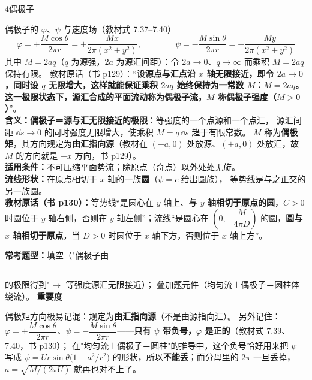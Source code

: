 \begin{kaodian}{4}{偶极子}
\begin{gongshi}{偶极子的 $\varphi$、$\psi$ 与速度场（教材式 7.37--7.40）}
\[ \varphi=+\frac{M\cos\theta}{2\pi r}=+\frac{Mx}{2\pi(x^2+y^2)},\qquad\qquad
   \psi=-\frac{M\sin\theta}{2\pi r}=-\frac{My}{2\pi(x^2+y^2)} \]
其中 $M=2aq$（$q$ 为源强，$2a$ 为源汇间距）：令 $2a\to0$、$q\to\infty$ 而乘积 $M=2aq$ 保持有限。
教材原话（书 p129）：“\textbf{设源点与汇点沿 $x$ 轴无限接近，即令 $2a\to0$，同时设 $q$ 无限增大，这样就能保证乘积 $2aq$ 始终保持为一常数 $M$：$M=2aq$。这一极限状态下，源汇合成的平面流动称为偶极子流，$M$ 称偶极子强度（$M>0$）}”。\\
\textbf{含义：}\textbf{偶极子＝源与汇无限接近的极限}：等强度的一个点源和一个点汇，
源汇间距 $\dd s\to0$ 的同时强度无限增大，使乘积 $M=q\,\dd s$ 趋于有限常数。
$M$ 称为\textbf{偶极矩}，其方向规定为\textbf{由汇指向源}（教材在 $(-a,0)$ 处放源、$(+a,0)$ 处放汇，故 $M$ 的方向就是 $-x$ 方向，书 p129）。\\
\textbf{适用条件：}不可压缩平面势流；除原点（奇点）以外处处无旋。\\
\textbf{流线形状：}在原点相切于 $x$ 轴的一族\textbf{圆}（$\psi=c$ 给出圆族），
等势线是与之正交的另一族圆。\\
\textbf{教材原话（书 p130）：}等势线“是圆心在 $y$ 轴上、\textbf{与 $y$ 轴相切于原点的圆}，$C>0$ 时圆位于 $y$ 轴右侧，否则在 $y$ 轴左侧”；流线“是圆心在 $\left(0,-\dfrac{M}{4\pi D}\right)$ 的圆，\textbf{圆与 $x$ 轴相切于原点}，当 $D>0$ 时圆位于 $x$ 轴下方，否则位于 $x$ 轴上方”。
\end{gongshi}
\textbf{常考题型：}填空（"偶极子由\rule{1.8cm}{0.4pt}的极限得到"$\to$ 等强度源汇无限接近）；
叠加题元件（均匀流＋偶极子＝圆柱体绕流）。
\textbf{重要度 }\quad{}\quad{}

\begin{yicuo}
偶极矩方向极易记混：规定为\textbf{由汇指向源}（不是由源指向汇）。
另外记住：$\varphi=+\dfrac{M\cos\theta}{2\pi r}$、$\psi=-\dfrac{M\sin\theta}{2\pi r}$——\textbf{只有 $\psi$ 带负号，$\varphi$ 是正的}（教材式 7.39、7.40，书 p130）；
在"均匀流＋偶极子＝圆柱"的推导中，这个负号恰好用来把 $\psi$ 写成
$\psi=Ur\sin\theta\bigl(1-a^2/r^2\bigr)$ 的形状，所以\textbf{不能丢}；而分母里的 $2\pi$ 一旦丢掉，$a=\sqrt{M/(2\pi U)}$ 就再也对不上了。
\end{yicuo}


\end{kaodian}
